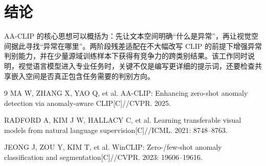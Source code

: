 \documentclass[UTF8,a4paper,10pt,fontset=windows]{ctexart}
\begin{document}
\section{结论}

AA-CLIP 的核心思想可以概括为：先让文本空间明确“什么是异常”，再让视觉空间据此寻找“异常在哪里”。两阶段残差适配在不大幅改写 CLIP 的前提下增强异常判别能力，并在少量源域训练样本下获得有竞争力的跨类别结果。该工作同时说明，视觉语言模型进入专业任务时，关键不仅是编写更详细的提示词，还要检查共享嵌入空间是否真正包含任务需要的判别方向。

\begin{thebibliography}{9}
\footnotesize
{}
MA W, ZHANG X, YAO Q, et al. AA-CLIP: Enhancing zero-shot anomaly detection via anomaly-aware CLIP[C]//CVPR. 2025.

RADFORD A, KIM J W, HALLACY C, et al. Learning transferable visual models from natural language supervision[C]//ICML. 2021: 8748--8763.

JEONG J, ZOU Y, KIM T, et al. WinCLIP: Zero-/few-shot anomaly classification and segmentation[C]//CVPR. 2023: 19606--19616.
\end{thebibliography}
\end{document}
